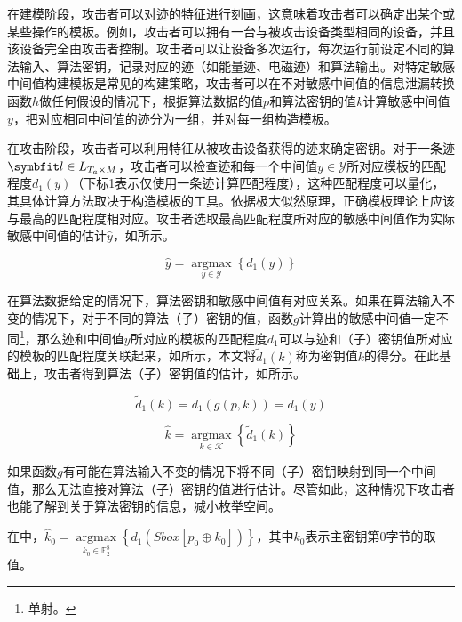 {	在建模阶段，攻击者可以对迹的特征进行刻画，这意味着攻击者可以确定出某个或某些操作的模板。例如，攻击者可以拥有一台与被攻击设备类型相同的设备，并且该设备完全由攻击者控制。攻击者可以让设备多次运行，每次运行前设定不同的算法输入、算法密钥，记录对应的迹（如能量迹、电磁迹）和算法输出。对特定敏感中间值构建模板是常见的构建策略，攻击者可以在不对敏感中间值的信息泄漏转换函数$h$做任何假设的情况下，根据算法数据的值$p$和算法密钥的值$k$计算敏感中间值$y$，把对应相同中间值的迹分为一组，并对每一组构造模板。
	
	在攻击阶段，攻击者可以利用特征从被攻击设备获得的迹来确定密钥。对于一条迹$\Vector l\in L_{T_a\times M}$，攻击者可以检查迹和每一个中间值$y\in\mathcal Y$所对应模板的匹配程度$d_1(y)$（下标1表示仅使用一条迹计算匹配程度），这种匹配程度可以量化，其具体计算方法取决于构造模板的工具。依据极大似然原理，正确模板理论上应该与最高的匹配程度相对应\citep{Kay1998}。攻击者选取最高匹配程度所对应的敏感中间值作为实际敏感中间值的估计$\hat y$，如所示。
	
	\begin{equation}\label{eq:1tracey}
		\hat y=\mathop{\mathrm{argmax}}\limits_{y\in\mathcal Y}\left\lbrace d_1(y)\right\rbrace
	\end{equation}
	
	在算法数据给定的情况下，算法密钥和敏感中间值有对应关系。如果在算法输入不变的情况下，对于不同的算法（子）密钥的值，函数$g$计算出的敏感中间值一定不同\footnote{单射。}，那么迹和中间值$y$所对应的模板的匹配程度$d_1$可以与迹和（子）密钥值所对应的模板的匹配程度关联起来，如所示，本文将$\tilde d_1(k)$称为密钥值$k$的得分。在此基础上，攻击者得到算法（子）密钥值的估计，如所示。
	
	\begin{equation}\label{eq:gsup-1}
		\tilde d_1(k)=d_1\left(g(p,k) \right)=d_1(y)
	\end{equation}
	
	\begin{equation}\label{eq:1tracek}
		\hat k=\mathop{\mathrm{argmax}}\limits_{k\in\mathcal K}\left\lbrace \tilde d_1(k)\right\rbrace 
	\end{equation}
	
	如果函数$g$有可能在算法输入不变的情况下将不同（子）密钥映射到同一个中间值，那么无法直接对算法（子）密钥的值进行估计。尽管如此，这种情况下攻击者也能了解到关于算法密钥的信息，减小枚举空间。
	
	\begin{example}
		在中，$\hat k_0=\mathop{\mathrm{argmax}}\limits_{k_0\in\mathbb F_2^8}\left\lbrace d_1\left(Sbox\left[p_0\oplus k_0\right]\right)\right\rbrace $，其中$k_0$表示主密钥第0字节的取值。
	\end{example}

}
